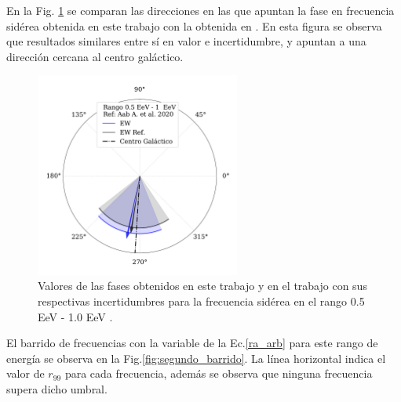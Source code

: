     En la Fig. \ref{fig:segundo} se comparan las direcciones en las que apuntan la fase en frecuencia sidérea obtenida en este trabajo con la obtenida en \cite{Aab_2020}. En esta figura se observa que resultados similares entre sí en valor e incertidumbre, y apuntan a una dirección cercana al centro galáctico.


    
    \begin{figure}[H]
        \begin{small}
            \begin{center}
                \includegraphics[width=0.6\textwidth]{phase_segundo_bin_v3.pdf}
            \end{center}
            \caption{Valores de las fases obtenidos en este trabajo y en el trabajo \cite{Aab_2020} con sus respectivas incertidumbres para la frecuencia sidérea en el rango 0.5 EeV - 1.0 EeV .}
            \label{fig:segundo}
        \end{small}
    \end{figure}

    El barrido de frecuencias con la variable de la Ec.\ref{ra_arb} para este rango de energía se observa en la Fig.\ref{fig:segundo_barrido}. La línea horizontal indica el valor de $r_{99}$ para cada frecuencia, además se observa que ninguna frecuencia supera dicho umbral. 

